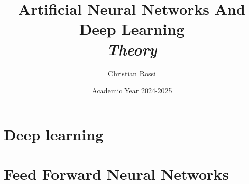 \documentclass[12pt, a4paper]{report}
\title{\textbf{Artificial Neural Networks And Deep Learning} \\ \textit{Theory}}
\author{Christian Rossi}
\date{Academic Year 2024-2025}
\begin{document}
    \maketitle

    

    \cleardoublepage

    \tableofcontents

    \cleardoublepage

    \chapter{Deep learning}
    
    
    

    \chapter{Feed Forward Neural Networks}
    
    
    
    
    
\end{document}
